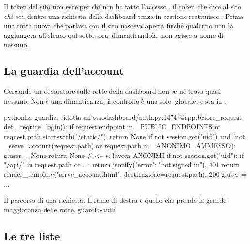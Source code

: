 \begin{nota}{Il token del sito non esce per chi non ha fatto l'accesso}
, il token che dice al sito \emph{chi sei}, dentro una
richiesta della dashboard senza  in sessione restituisce
. Prima una rotta nuova che parlava con il sito nasceva aperta
finché qualcuno non la aggiungeva all'elenco 
qui sotto; ora, dimenticandola, non agisce a nome di nessuno.
\end{nota}

\subsection{La guardia dell'account}

Cercando un decoratore  sulle rotte della dashboard non
se ne trova quasi nessuno. Non è una dimenticanza: il controllo è uno solo,
globale, e sta in .

\begin{codiceInterno}{python}{La guardia, ridotta all'osso}{dashboard/auth.py:1474}
@app.before_request
def _require_login():
    if request.endpoint in _PUBLIC_ENDPOINTS or request.path.startswith("/static/"):
        return None
    if not session.get("uid") and (not _serve_account(request.path)
                                   or request.path in _ANONIMO_AMMESSO):
        g.user = None
        return None            # <-- si lavora ANONIMI
    if not session.get("uid"):
        if "/api/" in request.path or ...:
            return jsonify({"error": "not signed in"}), 401
        return render_template("serve_account.html", destinazione=request.path), 200
    g.user = {...}
\end{codiceInterno}

  {Il percorso di una richiesta. Il ramo di destra è quello che prende la
   grande maggioranza delle rotte.}
  {guardia-auth}

\subsection{Le tre liste}

